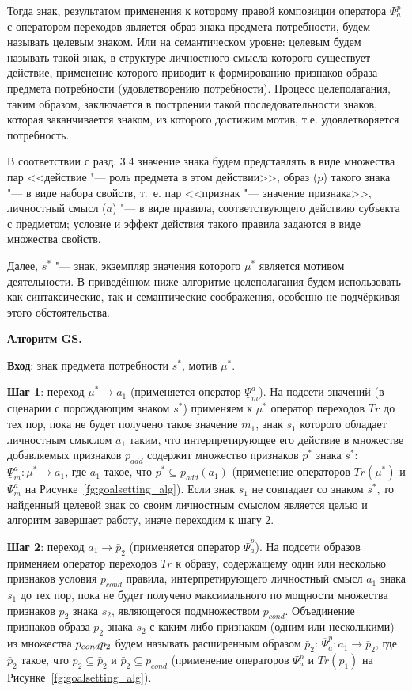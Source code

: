Тогда знак, результатом применения к которому правой композиции оператора $\Psi_a^p$ с оператором переходов является образ знака предмета потребности, будем называть целевым знаком. Или на семантическом уровне: целевым будем называть такой знак, в структуре личностного смысла которого существует действие, применение которого приводит к формированию признаков образа предмета потребности (удовлетворению потребности). Процесс целеполагания, таким образом, заключается в построении такой последовательности знаков, которая заканчивается знаком, из которого достижим мотив, т.е. удовлетворяется потребность.

В соответствии с разд. 3.4 значение знака будем представлять в виде множества пар <<действие "--- роль предмета в этом действии>>, образ ($p$) такого знака "--- в виде набора свойств, т.~е. пар <<признак "--- значение признака>>, личностный смысл ($a$) "--- в виде правила, соответствующего действию субъекта с предметом; условие и эффект действия такого правила задаются в виде множества свойств.

Далее, $s^*$ "--- знак, экземпляр значения которого $\mu^*$ является мотивом деятельности. В приведённом ниже алгоритме целеполагания будем использовать как синтаксические, так и семантические соображения, особенно не подчёркивая этого обстоятельства.

\textbf{Алгоритм GS.}

\textbf{Вход}: знак предмета потребности $s^*$, мотив $\mu^*$.

\textbf{Шаг 1}: переход $\mu^*\rightarrow a_1$ (применяется оператор $\underline{\Psi}_m^a$). На подсети значений (в сценарии с порождающим знаком $s^*$) применяем к $\mu^*$ оператор переходов $Tr$ до тех пор, пока не будет получено такое значение $m_1$, знак $s_1$ которого обладает личностным смыслом $a_1$ таким, что интерпретирующее его действие в множестве добавляемых признаков $p_{add}$ содержит множество признаков $p^*$ знака $s^*$:  $\underline{\Psi}_m^a:\mu^*\rightarrow a_1$, где $a_1$ такое, что $p^*\subseteq p_{add}(a_1)$ (применение операторов $Tr(\mu^*)$ и $\Psi_m^a$ на Рисунке~\ref{fg:goalsetting_alg}). Если знак $s_1$ не совпадает со знаком $s^*$, то найденный целевой знак со своим личностным смыслом является целью и алгоритм завершает работу, иначе переходим к шагу 2.

\textbf{Шаг 2}: переход $a_1\rightarrow\bar p_2$  (применяется оператор $\overline{\Psi}_a^p$). На подсети образов применяем оператор переходов $Tr$ к образу, содержащему один или несколько признаков условия $p_{cond}$ правила, интерпретирующего личностный смысл $a_1$ знака $s_1$ до тех пор, пока не будет получено максимального по мощности множества признаков $p_2$ знака $s_2$, являющегося подмножеством $p_{cond}$. Объединение признаков образа $p_2$ знака $s_2$ с каким-либо признаком (одним или несколькими) из множества $p_{cond}\\p_2$ будем называть расширенным образом $\bar p_2$: $\overline{\Psi}_a^p:a_1\rightarrow\bar p_2$, где $\bar p_2$ такое, что $p_2\subseteq\bar p_2$  и  $\bar p_2\subseteq p_{cond}$ (применение операторов $\Psi_a^p$ и $Tr(p_1)$ на Рисунке~\ref{fg:goalsetting_alg}).

